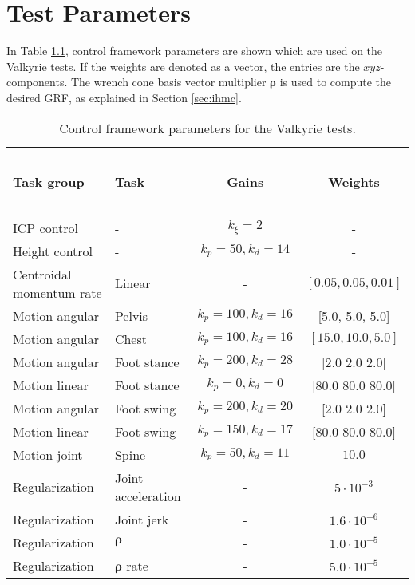 %
\chapter{Test Parameters}\label{chap:params}
In Table \ref{tab:params}, control framework parameters are shown which are used on the Valkyrie tests.  If the weights are denoted as a vector, the entries are the $xyz$-components. The wrench cone basis vector multiplier $\boldsymbol{\rho}$ is used to  compute the desired \ac{GRF}, as explained in Section \ref{sec:ihmc}.

\begin{table}[h]
\caption{Control framework parameters for the Valkyrie tests.}
\label{tab:params}
\begin{center}
\begin{tabular}{llcc}
\hline~\\[-2ex]
\textbf{Task group} & \textbf{Task} & \textbf{Gains} & \textbf{Weights}\\
\hline ~\\[-2ex]
ICP control & - & $k_{\xi}=2$ & - \\
Height control & - & $k_p=50, k_d=14$ & - \\
Centroidal momentum rate & Linear & - & $[0.05, 0.05, 0.01]$ \\
Motion angular & Pelvis & $k_p=100, k_d=16$ & [5.0, 5.0, 5.0]\\
Motion angular & Chest & $k_p=100, k_d=16$ & $[15.0, 10.0, 5.0]$\\
Motion angular & Foot stance & $k_p=200, k_d=28$ &  [2.0 2.0 2.0]\\
Motion linear & Foot stance & $k_p=0, k_d=0$ & [80.0 80.0 80.0]\\
Motion angular & Foot swing & $k_p=200, k_d=20$ & [2.0 2.0 2.0]\\
Motion linear & Foot swing & $k_p=150, k_d=17$ & [80.0 80.0 80.0]\\
Motion joint& Spine & $k_p=50, k_d=11$ & $10.0$\\
Regularization & Joint acceleration & - & $5 \cdot 10^{-3}$\\
Regularization & Joint jerk & - & $1.6 \cdot 10^{-6}$\\
Regularization & $\boldsymbol{\rho}$ & - & $1.0 \cdot 10^{-5}$\\
Regularization & $\boldsymbol{\rho}$ rate & - & $5.0 \cdot 10^{-5}$\\
\hline
\end{tabular}
\end{center}
\end{table}